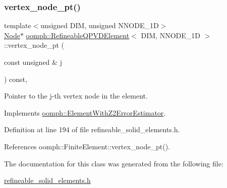 \subsubsection{\texorpdfstring{vertex\+\_\+node\+\_\+pt()}{vertex\_node\_pt()}}
{\footnotesize\ttfamily template$<$unsigned D\+IM, unsigned N\+N\+O\+D\+E\+\_\+1D$>$ \\
\hyperlink{classoomph_1_1Node}{Node}$\ast$ \hyperlink{classoomph_1_1RefineableQPVDElement}{oomph\+::\+Refineable\+Q\+P\+V\+D\+Element}$<$ D\+IM, N\+N\+O\+D\+E\+\_\+1D $>$\+::vertex\+\_\+node\+\_\+pt (\begin{DoxyParamCaption}\item[{const unsigned \&}]{j }\end{DoxyParamCaption}) const\hspace{0.3cm}{\ttfamily [inline]}, {\ttfamily [virtual]}}



Pointer to the j-\/th vertex node in the element. 



Implements \hyperlink{classoomph_1_1ElementWithZ2ErrorEstimator_a0eedccc33519f852c5dc2055ddf2774b}{oomph\+::\+Element\+With\+Z2\+Error\+Estimator}.



Definition at line 194 of file refineable\+\_\+solid\+\_\+elements.\+h.



References oomph\+::\+Finite\+Element\+::vertex\+\_\+node\+\_\+pt().



The documentation for this class was generated from the following file\+:\begin{DoxyCompactItemize}
\item 
\hyperlink{refineable__solid__elements_8h}{refineable\+\_\+solid\+\_\+elements.\+h}\end{DoxyCompactItemize}
